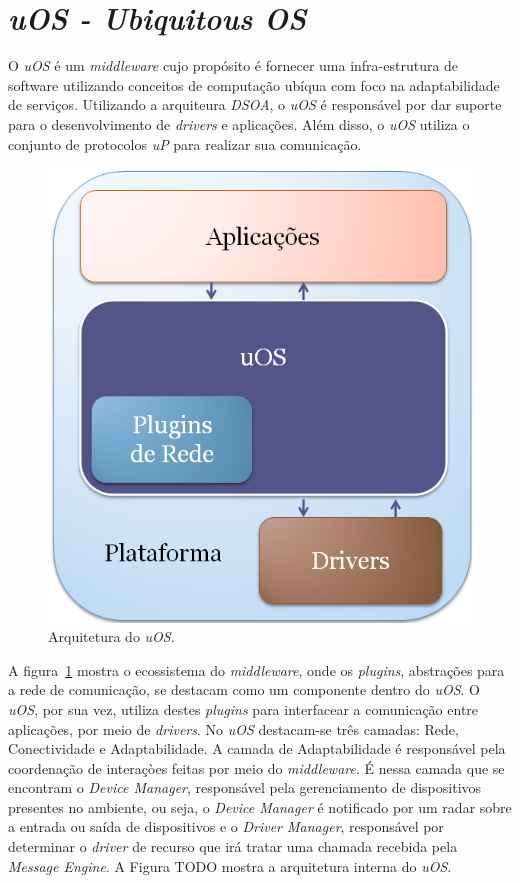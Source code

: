 \section{\emph{uOS - Ubiquitous OS}}

O \emph{uOS} é um \emph{middleware} cujo propósito é fornecer uma infra-estrutura de software utilizando conceitos de computação ubíqua com foco na adaptabilidade de serviços. Utilizando a arquiteura \emph{DSOA}, o \emph{uOS} é responsável por dar suporte para o desenvolvimento de \emph{drivers} e aplicações. Além disso, o \emph{uOS} utiliza o conjunto de protocolos \emph{uP} para realizar sua comunicação.

\begin{figure}[ht]
	\center
	\includegraphics[scale=0.4]{imagens/ecossistemaUbiquitos}
	\caption{Arquitetura do \emph{uOS}.}
	\label{fig:ecossistemaUbiquitos}
\end{figure}

A figura~\ref{fig:ecossistemaUbiquitos} mostra o ecossistema do \emph{middleware}, onde os \emph{plugins}, abstrações para a rede de comunicação, se destacam como um componente dentro do \emph{uOS}. O \emph{uOS}, por sua vez, utiliza destes \emph{plugins} para interfacear a comunicação entre aplicações, por meio de \emph{drivers}. No \emph{uOS} destacam-se três camadas: Rede, Conectividade e Adaptabilidade. A camada de Adaptabilidade é responsável pela coordenação de interaçòes feitas por meio do \emph{middleware}. É nessa camada que se encontram o \emph{Device Manager}, responsável pela gerenciamento de dispositivos presentes no ambiente, ou seja, o \emph{Device Manager} é notificado por um radar sobre a entrada ou saída de dispositivos e o \emph{Driver Manager}, responsável por determinar o \emph{driver} de recurso que irá tratar uma chamada recebida pela \emph{Message Engine}. A Figura TODO mostra a arquitetura interna do \emph{uOS}.

